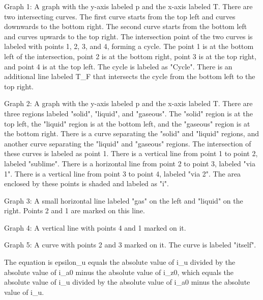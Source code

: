 Graph 1: A graph with the y-axis labeled p and the x-axis labeled T. There are two intersecting curves. The first curve starts from the top left and curves downwards to the bottom right. The second curve starts from the bottom left and curves upwards to the top right. The intersection point of the two curves is labeled with points 1, 2, 3, and 4, forming a cycle. The point 1 is at the bottom left of the intersection, point 2 is at the bottom right, point 3 is at the top right, and point 4 is at the top left. The cycle is labeled as "Cycle". There is an additional line labeled T_F that intersects the cycle from the bottom left to the top right.

Graph 2: A graph with the y-axis labeled p and the x-axis labeled T. There are three regions labeled "solid", "liquid", and "gaseous". The "solid" region is at the top left, the "liquid" region is at the bottom left, and the "gaseous" region is at the bottom right. There is a curve separating the "solid" and "liquid" regions, and another curve separating the "liquid" and "gaseous" regions. The intersection of these curves is labeled as point 1. There is a vertical line from point 1 to point 2, labeled "sublime". There is a horizontal line from point 2 to point 3, labeled "via 1". There is a vertical line from point 3 to point 4, labeled "via 2". The area enclosed by these points is shaded and labeled as "i".

Graph 3: A small horizontal line labeled "gas" on the left and "liquid" on the right. Points 2 and 1 are marked on this line.

Graph 4: A vertical line with points 4 and 1 marked on it.

Graph 5: A curve with points 2 and 3 marked on it. The curve is labeled "itself".

The equation is epsilon_u equals the absolute value of i_u divided by the absolute value of i_a0 minus the absolute value of i_z0, which equals the absolute value of i_u divided by the absolute value of i_a0 minus the absolute value of i_u.